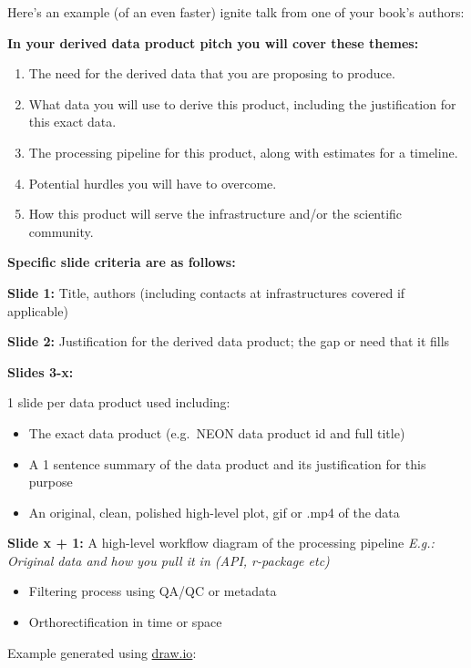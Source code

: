 \documentclass[
  letterpaper,
]{book}
\begin{document}
Here's an example (of an even faster) ignite talk from one of your
book's authors:

\textbf{In your derived data product pitch you will cover these themes:}

\begin{enumerate}
\def\labelenumi{\arabic{enumi}.}
\item
  The need for the derived data that you are proposing to produce.
\item
  What data you will use to derive this product, including the
  justification for this exact data.
\item
  The processing pipeline for this product, along with estimates for a
  timeline.
\item
  Potential hurdles you will have to overcome.
\item
  How this product will serve the infrastructure and/or the scientific
  community.
\end{enumerate}

\textbf{Specific slide criteria are as follows:}

\textbf{Slide 1:} Title, authors (including contacts at infrastructures
covered if applicable)

\textbf{Slide 2:} Justification for the derived data product; the gap or
need that it fills

\textbf{Slides 3-x:}

1 slide per data product used including:

\begin{itemize}
\item
  The exact data product (e.g.~NEON data product id and full title)
\item
  A 1 sentence summary of the data product and its justification for
  this purpose
\item
  An original, clean, polished high-level plot, gif or .mp4 of the data
\end{itemize}

\textbf{Slide x + 1:} A high-level workflow diagram of the processing
pipeline \emph{E.g.: Original data and how you pull it in (API,
r-package etc)}

\begin{itemize}
\item
  Filtering process using QA/QC or metadata
\item
  Orthorectification in time or space
\end{itemize}

Example generated using \href{https://app.diagrams.net/}{draw.io}:
\end{document}
